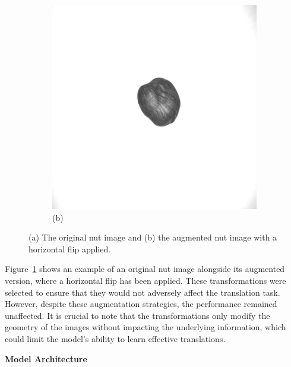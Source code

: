 \documentclass[12pt,DIV14,BCOR12mm,a4paper,footinclude=false,headinclude,parskip=half-,twoside,openright,cleardoublepage=empty,toc=index,bibliography=totoc,listof=totoc]{scrreprt}
\numberwithin{equation}{chapter}
\begin{document}
\begin{figure}
\begin{subfigure}[b]{0.45\textwidth}
        \includegraphics[scale=0.15]{../media/augmented_horizontal_flip.png} %
        \caption*{(b)}
    \end{subfigure}
    \caption{(a) The original nut image and (b) the augmented nut image with a horizontal flip applied.}
    \label{fig:nut_comparison}
\end{figure}

Figure~\ref{fig:nut_comparison} shows an example of an original nut image alongside its augmented version, where a horizontal flip has been applied.
These transformations were selected to ensure that they would not adversely affect the translation task. However, despite these augmentation strategies, the performance remained unaffected. It is crucial to note that the transformations only modify the geometry of the images without impacting the underlying information, which could limit the model's ability to learn effective translations.

\textbf{Model Architecture}
\end{document}
